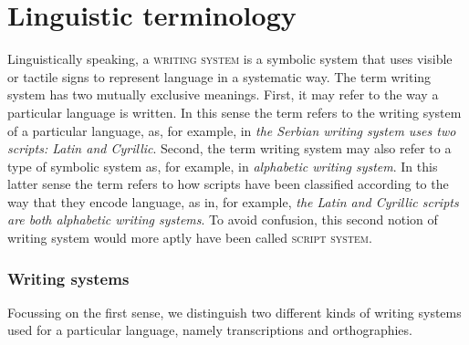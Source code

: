 \section{Linguistic terminology}
\label{linguistic-terminology}

Linguistically speaking, a \textsc{writing system} is a symbolic system that
uses visible or tactile signs to represent language in a systematic way. The
term writing system has two mutually exclusive meanings. First, it may
refer to the way a particular language is written. In this sense the term refers
to the writing system of a particular language, as, for example, in \emph{the
Serbian writing system uses two scripts: Latin and Cyrillic}. Second, the term
writing system may also refer to a type of symbolic system as, for example, in
\emph{alphabetic writing system}. In this latter sense the term refers to how
scripts have been classified according to the way that they encode language, as
in, for example, \emph{the Latin and Cyrillic scripts are both alphabetic
writing systems}. To avoid confusion, this second notion of writing system
would more aptly have been called \textsc{script system}. 

\subsubsection*{Writing systems}

Focussing on the first sense, we distinguish two different kinds of 
writing systems used for a particular language, namely transcriptions and
orthographies.

